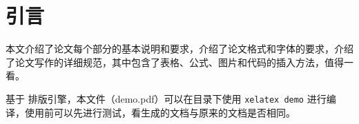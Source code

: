 \chapter{引言}
\label{chap:references}
本文介绍了论文每个部分的基本说明和要求，介绍了论文格式和字体的要求，介绍了论文写作的详细规范，其中包含了表格、公式、图片和代码的插入方法，值得一看。

基于 \LaTeXe 排版引擎，本文件（demo.pdf）可以在目录下使用 \lstinline|xelatex demo| 进行编译，使用前可以先进行测试，看生成的文档与原来的文档是否相同。
